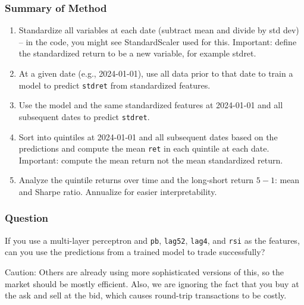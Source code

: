 \documentclass[10pt]{beamer}
\begin{document}
\begin{frame}[fragile]\frametitle{Summary of Method}
\begin{enumerate}
\item Standardize all variables at each date (subtract mean and divide by std dev) -- in the code, you might see StandardScaler used for this.  \alert{Important: define the standardized return to be a new variable, for example stdret.}
\item At a given date (e.g., 2024-01-01), use all data prior to that date to train a model to predict \verb!stdret! from standardized features.
\item Use the model and the same standardized features at 2024-01-01 and all subsequent dates to predict \verb!stdret!.
\item Sort into quintiles at 2024-01-01 and all subsequent dates based on the predictions and compute the mean \verb!ret! in each quintile at each date.  \alert{Important: compute the mean return not the mean standardized return.}
\item Analyze the quintile returns over time and the long-short return $5-1$: mean and Sharpe ratio.  Annualize for easier interpretability.
\end{enumerate}
\end{frame}

\begin{frame}[fragile]\frametitle{Question}
    If you use a multi-layer perceptron and \verb!pb!, \verb!lag52!, \verb!lag4!, and \verb!rsi! as the features, can you use the predictions from a trained model to trade successfully?
    \vspace{2em}
    
    \alert{Caution: Others are already using more sophisticated versions of this, so the market should be mostly efficient.  Also, we are ignoring the fact that you buy at the ask and sell at the bid, which causes round-trip transactions to be costly.}
\end{frame}
\end{document}
